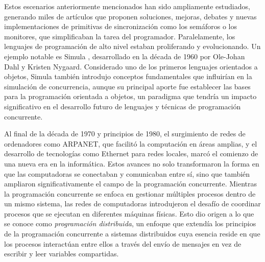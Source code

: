 Estos escenarios anteriormente mencionados han sido ampliamente estudiados, generando miles de artículos que proponen soluciones, mejoras, debates y nuevas implementaciones de primitivas de sincronización como los semáforos o los monitores, que simplificaban la tarea del programador. Paralelamente, los lenguajes de programación de alto nivel estaban proliferando y evolucionando. Un ejemplo notable es Simula \cite{Sklenar1997OOPSimula}, desarrollado en la década de 1960 por Ole-Johan Dahl y Kristen Nygaard. Considerado uno de los primeros lenguajes orientados a objetos, Simula también introdujo conceptos fundamentales que influirían en la simulación de concurrencia, aunque su principal aporte fue establecer las bases para la programación orientada a objetos, un paradigma que tendría un impacto significativo en el desarrollo futuro de lenguajes y técnicas de programación concurrente.


Al final de la década de 1970 y principios de 1980, el surgimiento de redes de ordenadores como ARPANET, que facilitó la computación en áreas amplias, y el desarrollo de tecnologías como Ethernet para redes locales, marcó el comienzo de una nueva era en la informática. Estos avances no solo transformaron la forma en que las computadoras se conectaban y comunicaban entre sí, sino que también ampliaron significativamente el campo de la programación concurrente. Mientras la programación concurrente se enfoca en gestionar múltiples procesos dentro de un mismo sistema, las redes de computadoras introdujeron el desafío de coordinar procesos que se ejecutan en diferentes máquinas físicas. Esto dio origen a lo que se conoce como \textit{programación distribuida}, un enfoque que extendía los principios de la programación concurrente a sistemas distribuidos cuya esencia reside en que los procesos interactúan entre ellos a través del envío de mensajes en vez de escribir y leer variables compartidas.


